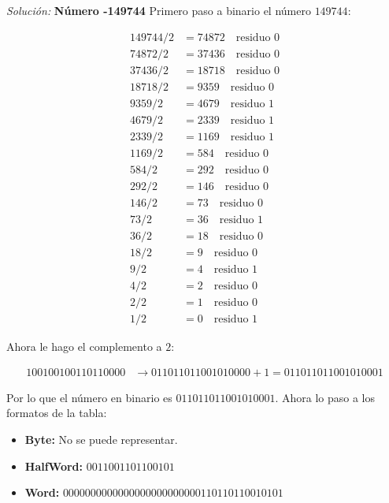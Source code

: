 \documentclass{article}
\newenvironment{solution}
    {\textit{Solución:}}
    {}
\begin{document}
\begin{solution}
\textbf{Número -149744}
Primero paso a binario el número $149744$:

\begin{align*}
    149744/2 &= 74872 \quad \text{residuo } 0\\
    74872/2 &= 37436 \quad \text{residuo } 0\\
    37436/2 &= 18718 \quad \text{residuo } 0\\
    18718/2 &= 9359 \quad \text{residuo } 0\\
    9359/2 &= 4679 \quad \text{residuo } 1\\
    4679/2 &= 2339 \quad \text{residuo } 1\\
    2339/2 &= 1169 \quad \text{residuo } 1\\
    1169/2 &= 584 \quad \text{residuo } 0\\
    584/2 &= 292 \quad \text{residuo } 0\\
    292/2 &= 146 \quad \text{residuo } 0\\
    146/2 &= 73 \quad \text{residuo } 0\\
    73/2 &= 36 \quad \text{residuo } 1\\
    36/2 &= 18 \quad \text{residuo } 0\\
    18/2 &= 9 \quad \text{residuo } 0\\
    9/2 &= 4 \quad \text{residuo } 1\\
    4/2 &= 2 \quad \text{residuo } 0\\
    2/2 &= 1 \quad \text{residuo } 0\\
    1/2 &= 0 \quad \text{residuo } 1
\end{align*}

Ahora le hago el complemento a $2$:

\begin{align*}
    100100100110110000 &\rightarrow 011011011001010000 + 1 = 011011011001010001
\end{align*}

Por lo que el número en binario es $011011011001010001$. Ahora lo paso a los formatos de la tabla:

\begin{itemize}
    \item \textbf{Byte:} No se puede representar.
    \item \textbf{HalfWord:} $0011001101100101$
    \item \textbf{Word:} $0000000000000000000000000110110110010101$
\end{itemize}

\end{solution}
\end{document}
